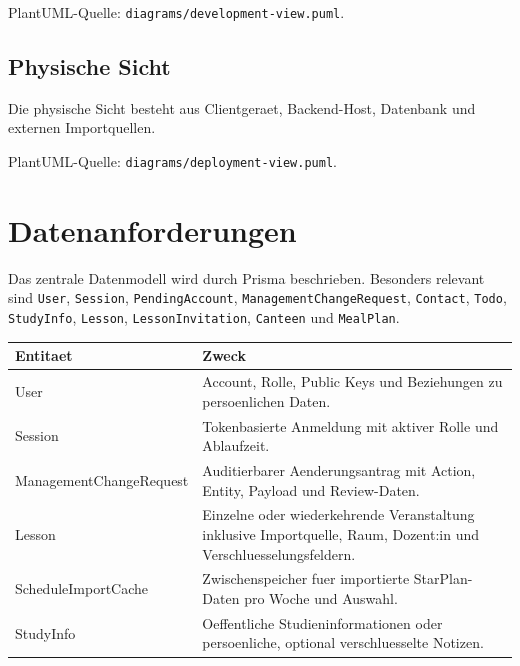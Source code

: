 \documentclass[11pt,a4paper]{article}
\begin{document}
PlantUML-Quelle: \texttt{diagrams/development-view.puml}.

\subsection{Physische Sicht}
Die physische Sicht besteht aus Clientgeraet, Backend-Host, Datenbank und externen Importquellen.

\begin{center}
\end{center}

PlantUML-Quelle: \texttt{diagrams/deployment-view.puml}.

\section{Datenanforderungen}
Das zentrale Datenmodell wird durch Prisma beschrieben. Besonders relevant sind \texttt{User}, \texttt{Session}, \texttt{PendingAccount}, \texttt{ManagementChangeRequest}, \texttt{Contact}, \texttt{Todo}, \texttt{StudyInfo}, \texttt{Lesson}, \texttt{LessonInvitation}, \texttt{Canteen} und \texttt{MealPlan}.

\begin{tabularx}{\textwidth}{@{}lY@{}}
\toprule
Entitaet & Zweck\\
\midrule
User & Account, Rolle, Public Keys und Beziehungen zu persoenlichen Daten.\\
Session & Tokenbasierte Anmeldung mit aktiver Rolle und Ablaufzeit.\\
ManagementChangeRequest & Auditierbarer Aenderungsantrag mit Action, Entity, Payload und Review-Daten.\\
Lesson & Einzelne oder wiederkehrende Veranstaltung inklusive Importquelle, Raum, Dozent:in und Verschluesselungsfeldern.\\
ScheduleImportCache & Zwischenspeicher fuer importierte StarPlan-Daten pro Woche und Auswahl.\\
StudyInfo & Oeffentliche Studieninformationen oder persoenliche, optional verschluesselte Notizen.\\
\bottomrule
\end{tabularx}
\end{document}
